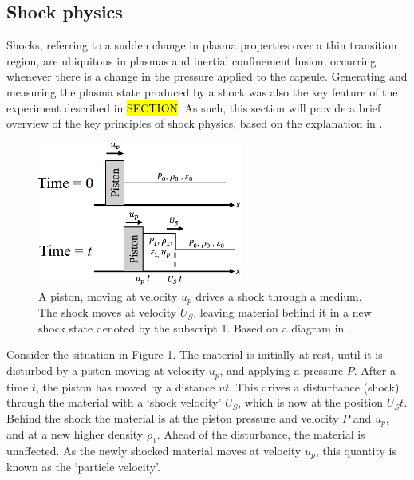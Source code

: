 \subsection{Shock physics}

Shocks, referring to a sudden change in plasma properties over a thin transition region, are ubiquitous in plasmas and inertial confinement fusion, occurring whenever there is a change in the pressure applied to the capsule. Generating and measuring the plasma state produced by a shock was also the key feature of the experiment described in \hl{SECTION}. As such, this section will provide a brief overview of the key principles of shock physics, based on the explanation in \cite{Zeldovich1966}.

\begin{figure}
\centering
\includegraphics[width=0.6\textwidth]{figures/Theory/Piston.pdf}%
\caption{\label{fig:Piston} A piston, moving at velocity $u_p$ drives a shock through a medium. The shock moves at velocity $U_S$, leaving material behind it in a new shock state denoted by the subscript 1. Based on a diagram in \cite{Zeldovich1966}.}
\end{figure}

Consider the situation in Figure \ref{fig:Piston}. The material is initially at rest, until it is disturbed by a piston moving at velocity $u_p$, and applying a pressure $P$. After a time $t$, the piston has moved by a distance $ut$. This drives a disturbance (shock) through the material with a `shock velocity' $U_S$, which is now at the position $U_S t$. Behind the shock the material is at the piston pressure and velocity $P$ and $u_p$, and at a new higher density $\rho_1$. Ahead of the disturbance, the material is unaffected. As the newly shocked material moves at velocity $u_p$, this quantity is known as the `particle velocity'.

